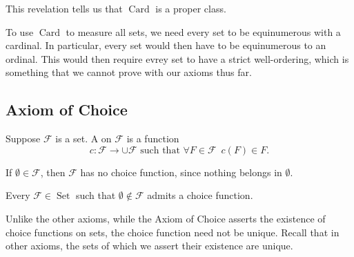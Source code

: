 \documentclass[notoc,notitlepage]{tufte-book}
\DeclareMathOperator{\Card}{Card }
\DeclareMathOperator{\Set}{Set }
\begin{document}
\begin{remark}
  This revelation tells us that $\Card$ is a proper class.
\end{remark}

To use $\Card$ to measure all sets, we need every set to be equinumerous with a cardinal. In particular, every set would then have to be equinumerous to an ordinal. This would then require evrey set to have a strict well-ordering, which is something that we cannot prove with our axioms thus far.

\subsection{Axiom of Choice}%
\label{sub:axiom_of_choice}

\begin{defn}
\label{defn:choice_function}
  Suppose $\mathcal{F}$ is a set. A  on $\mathcal{F}$ is a function
  \begin{equation*}
    c : \mathcal{F} \to \cup \mathcal{F} \text{ such that } \forall F \in \mathcal{F} \enspace c(F) \in F.
  \end{equation*}
\end{defn}

\begin{note}
  If $\emptyset \in \mathcal{F}$, then $\mathcal{F}$ has no choice function, since nothing belongs in $\emptyset$.
\end{note}

\begin{axiom}
\label{axiom:axiom_of_choice}
  Every $\mathcal{F} \in \Set$ such that $\emptyset \notin \mathcal{F}$ admits a choice function.
\end{axiom}

\begin{note}
  Unlike the other axioms, while the Axiom of Choice asserts the existence of choice functions on sets, the choice function need not be unique. Recall that in other axioms, the sets of which we assert their existence are unique.
\end{note}
\end{document}
